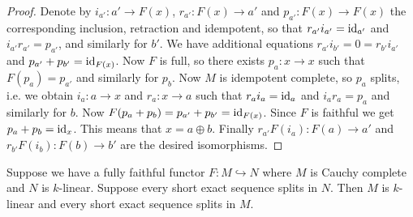 \begin{proof}
  Denote by $i_{a'}:a'\to F(x)$, $r_{a'}:F(x)\to a'$ and $p_{a'}:F(x)\to F(x)$
  the corresponding inclusion, retraction and idempotent, so that
  $r_{a'}i_{a'}=\operatorname{id}_{a'}$ and $i_{a'} r_{a'}=p_{a'}$, and similarly for $b'$.
  We have additional equations $r_{a'}i_{b'}=0=r_{b'}i_{a'}$ and
  $p_{a'}+p_{b'}=\operatorname{id}_{F(x)}$. Now $F$ is full, so there exists $p_a:x\to x$
  such that $F(p_a)=p_{a'}$ and similarly for $p_b$. Now $M$ is idempotent
  complete, so $p_a$ splits, i.e. we obtain $i_a:a\to x$ and $r_a:x\to a$ such
  that $r_a i_a=\operatorname{id}_a$ and $i_a r_a=p_a$ and similarly for $b$. Now
  $F(p_a+p_b)=p_{a'}+p_{b'}=\operatorname{id}_{F(x)}$. Since $F$ is faithful we get
  $p_a+p_b=\operatorname{id}_x$. This means that $x=a\oplus b$. Finally
  $r_{a'}F(i_a):F(a)\to a'$ and $r_{b'}F(i_b):F(b)\to b'$ are the desired
  isomorphisms.
\end{proof}

\begin{lemma}\label{abelian}

  \noindent Suppose we have a fully faithful functor $F:M\hookrightarrow N$
  where $M$ is Cauchy complete and $N$ is $k$-linear. Suppose every short
  exact sequence splits in $N$. Then $M$ is $k$-linear and every short exact
  sequence splits in $M$.
\end{lemma}

